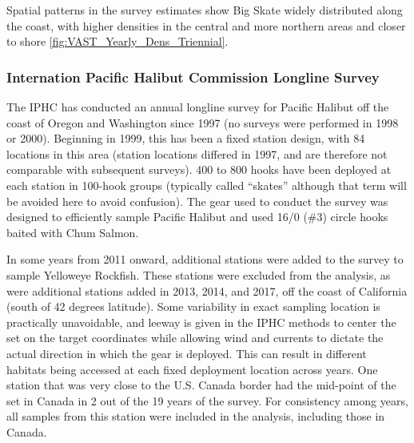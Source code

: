 \documentclass[12pt,]{article}
\begin{document}
Spatial patterns in the survey estimates show Big Skate widely
distributed along the coast, with higher densities in the central and
more northern areas and closer to shore
\ref{fig:VAST_Yearly_Dens_Triennial}.

\hypertarget{internation-pacific-halibut-commission-longline-survey}{%
\subsubsection{Internation Pacific Halibut Commission Longline
Survey}\label{internation-pacific-halibut-commission-longline-survey}}

The IPHC has conducted an annual longline survey for Pacific Halibut off
the coast of Oregon and Washington since 1997 (no surveys were performed
in 1998 or 2000). Beginning in 1999, this has been a fixed station
design, with 84 locations in this area (station locations differed in
1997, and are therefore not comparable with subsequent surveys). 400 to
800 hooks have been deployed at each station in 100-hook groups
(typically called ``skates'' although that term will be avoided here to
avoid confusion). The gear used to conduct the survey was designed to
efficiently sample Pacific Halibut and used 16/0 (\#3) circle hooks
baited with Chum Salmon.

In some years from 2011 onward, additional stations were added to the
survey to sample Yelloweye Rockfish. These stations were excluded from
the analysis, as were additional stations added in 2013, 2014, and 2017,
off the coast of California (south of 42 degrees latitude). Some
variability in exact sampling location is practically unavoidable, and
leeway is given in the IPHC methods to center the set on the target
coordinates while allowing wind and currents to dictate the actual
direction in which the gear is deployed. This can result in different
habitats being accessed at each fixed deployment location across years.
One station that was very close to the U.S. Canada border had the
mid-point of the set in Canada in 2 out of the 19 years of the survey.
For consistency among years, all samples from this station were included
in the analysis, including those in Canada.
\end{document}
